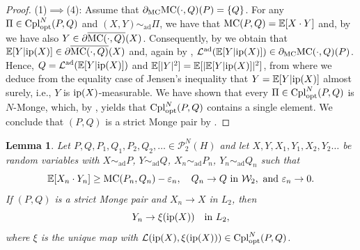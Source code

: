 \documentclass[a4paper]{amsart}
\numberwithin{theorem}{section}
\newtheorem{lemma}[theorem]{Lemma}
\theoremstyle{definition}
\newcommand{\E}{\mathbb{E}}
\newcommand{\law}{\mathcal{L}}
\newcommand{\cpl}{\textup{Cpl}}
\newcommand{\W}{\mathcal{W}}
\newcommand{\Pc}{\mathcal P}
\renewcommand{\epsilon}{\varepsilon}
\newcommand{\cplopt}{\cpl_{\rm opt}}
\newcommand{\simad}{\sim_{\mathrm{ad}}}
\renewcommand{\H}{H}
\newcommand{\mc}{\textup{MC}}
\newcommand{\ip}{\textup{ip}}
\newcommand{\lawad}{\law^{\textup{ad}}}
\begin{document}
\begin{proof}
(1)$\implies$(4): Assume that $\partial_\mc \mc(\cdot,Q)(P) = \{Q\}$. For any $\Pi \in \cplopt^N(P,Q)$ and $(X,Y) \simad \Pi$, we have that $\mc(P,Q) = \E[X \cdot Y]$ and, by  we have also $Y \in 
\partial \overline{\mc(\cdot,Q)}(X)$.
Consequently, by  we obtain that $\E[Y | \ip(X) ] \in \partial \overline{\mc(\cdot,Q)}(X)$ and, again by , $\lawad(\E[Y|\ip(X)]) \in \partial_\mc \mc(\cdot,Q)(P)$.
Hence, $Q = \lawad(\E[Y|\ip(X)])$ and $\E[|Y|^2] = \E[|\E[Y|\ip(X)]|^2]$, from where we deduce from the equality case of Jensen's inequality that $Y = \E[Y | \ip(X)]$ almost surely, i.e., $Y$ is $\ip(X)$-measurable.
We have shown that every $\Pi \in \cplopt^N(P,Q)$ is $N$-Monge, which, by , yields that $\cplopt^N(P,Q)$ contains a single element.
We conclude that $(P,Q)$ is a strict Monge pair by .
\end{proof}


\begin{lemma} \label{lem:analogue.to.AJ.2.5}
    Let $P,Q,P_1,Q_1,P_2,Q_2,\dots \in \Pc^N_2(\H)$ and let $X,Y,X_1,Y_1,X_2,Y_2\dots$ be random variables with $X \simad P$, $Y \simad Q$, $X_n \simad P_n$, $Y_n \simad Q_n$ such that
    \[
        \E[X_n \cdot Y_n] \ge \mc(P_n,Q_n) -\epsilon_n, \quad Q_n \to Q \text{ in }\W_2, \text{ and } \epsilon_n \to 0.
    \]
    If $(P,Q)$ is a strict Monge pair and $X_n \to X$ in $L_2$, then
    \[
        Y_n \to \xi(\ip(X)) \quad \text{in }L_2,
    \]
    where $\xi$ is the unique map with $\law (\ip(X),\xi(\ip(X))) \in \cplopt^N(P,Q)$.
\end{lemma}
\end{document}

